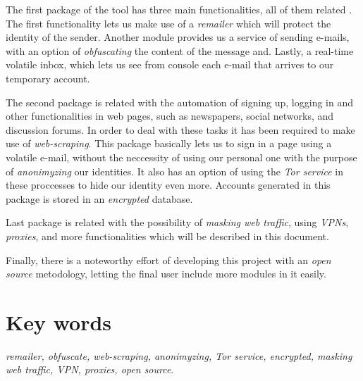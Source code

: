 The first package of the tool has three main functionalities, all of
them related . The first
functionality lets us make use of a \textit{remailer} which will
protect the identity of the sender. Another module provides us a
service of sending e-mails, with an option of \textit{obfuscating} the
content of the message and. Lastly, a real-time volatile inbox, which
lets us see from console each e-mail that arrives to our temporary
account.

The second package is related with the automation of signing up,
logging in and other functionalities in web pages, such as newspapers,
social networks, and discussion forums. In order to deal with these
tasks it has been required to make use of \textit{web-scraping}. This
package basically lets us to sign in a page using a volatile e-mail,
without the neccessity of using our personal one with the purpose of
\textit{anonimyzing} our identities. It also has an option of using
the \textit{Tor service} in these proccesses to hide our identity even
more. Accounts generated in this package is stored in an
\textit{encrypted} database.

Last package is related with the possibility of \textit{masking web
  traffic}, using \textit{VPNs}, \textit{proxies}, and more
functionalities which will be described in this document.

Finally, there is a noteworthy effort of developing this project with
an \textit{open source} metodology, letting the final user include
more modules in it easily.

\section*{Key words}
\textit{remailer, obfuscate, web-scraping, anonimyzing, Tor service, encrypted, masking web traffic, VPN, proxies, open source}.


